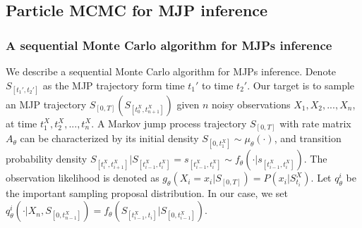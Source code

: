\subsection{Particle MCMC for MJP inference}
\label{sec:pmcmc}
\subsubsection{A sequential Monte Carlo algorithm for MJPs inference}
We describe a sequential Monte Carlo algorithm for MJPs inference. Denote $S_{[t_1', t_2']}$ as the MJP trajectory form time $t_1'$ to time $t_2'$. Our target is to sample an MJP trajectory $S_{[0, T]}(S_{[t_0^X, t_{n + 1}^X]})$ given $n$ noisy observations $X_1, X_2, ... , X_n$, at time $t_1^X, t_2^X, ..., t_n^X$. A Markov jump process trajectory $S_{[0, T]}$ with rate matrix $A_\theta$ can be characterized by its initial density $S_{[0, t_1^X]} \sim \mu_\theta (\cdot)$, and transition probability density $S_{[t_i^X, t_{i + 1}^X]} | S_{[t_{i - 1}^X, t_i^X]} = s_{[t_{i - 1}^X, t_i^X] } \sim f_\theta (\cdot | s_{[t_{i - 1}^X, t_i^X]})$.  
The observation likelihood is denoted as $g_\theta(X_i = x_i| S_{[0, T]}) = P(x_i | S^X_{t_i})$.
Let $q_\theta^i$ be the important sampling proposal distribution. In our case, we set $q_\theta^i(\cdot| X_n, S_{[0, t^X_{n-1}]}) = f_\theta(S_{[t^X_{i-1},t_i]}| S_{[0, t^X_{i-1}]})$.%


